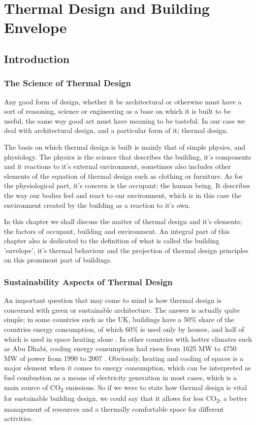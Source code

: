 \chapter{Thermal Design and Building Envelope}
\section{Introduction}

\subsection{The Science of Thermal Design}
Any good form of design, whether it be architectural or otherwise must have a sort of reasoning,
science or engineering as a base on which it is built to be useful, the same way good art must have
meaning to be tasteful. In our case we deal with architectural design, and a particular form of it;
thermal design.

The basis on which thermal design is built is mainly that of simple physics, and physiology. The
physics is the science that describes the building, it's components and it reactions to it's
external environment, sometimes also includes other elements of the equation of thermal design such
as clothing or furniture. As for the physiological part, it's concern is the occupant; the human
being. It describes the way our bodies feel and react to our environment, which is in this case the
environment created by the building as a reaction to it's own.

In this chapter we shall discuss the matter of thermal design and it's elements; the
factors of occupant, building and environment. An integral part of this
chapter also is dedicated to the definition of what is called the building 'envelope', it's thermal
behaviour and the projection of thermal design principles on this prominent part of buildings.

\subsection{Sustainability Aspects of Thermal Design}
An important question that may come to mind is how thermal design is concerned with green or
sustainable architecture. The answer is actually quite simple; in some countries such as the UK,
buildings have a 50\% share of the countries energy consumption, of which 60\% is used only by
houses, and half of which is used in space heating alone \cite{edwards96}. In other countries with
hotter climates such as Abu Dhabi, cooling energy consumption had risen from 1625 MW to 4750 MW of
power from 1990 to 2007 \cite{nauman07}. Obviously, heating and cooling of spaces is a major
element when it comes to energy consumption, which can be interpreted as fuel combustion as a means
of electricity generation in most cases, which is a main source of CO\textsubscript{2} emissions. So
if we were to state how thermal design is vital for sustainable building design, we could say that it allows
for less CO\textsubscript{2}, a better management of resources and a thermally comfortable space
for different activities.

